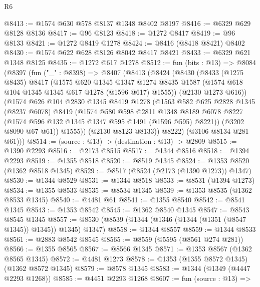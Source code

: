 \begin{lexlean}{R6}
\begin{coremodule}
@8413 := @1574 @630 @578 @8137 @1348 @8402 @8197
@8416 := @6329 @629 @8128 @8136
@8417 := @96 @8123
@8418 := @1272 @8417
@8419 := @96 @8133
@8421 := @1272 @8419 @1278
@8424 := @8416 (@8418 @8421) @8402
@8430 := @1574 @622 @628 @8126 @8042 @8417 @8421
@8433 := @6329 @621 @1348 @8125
@8435 := @1272 @617 @1278
@8512 := fun (bits : @13) =>
  @8084
    (@8397
      (fun ("_" : @8398) =>
      @8407
        (@8413
          (@8424
            (@8430
              (@8433
                (@1275 @8435)
                @8417
                (@1575
                  @620
                  @1345
                  @1347
                  @1274
                  @8435
                  @1587
                  (@1574 @618 @104 @1345 @1345 @617 @1278 (@1596 @617) @1555))
                (@2130 @1273 @616))
              (@1574
                @626
                @104
                @2830
                @1345
                @8419
                @1278
                (@1563
                  @582
                  @625
                  @2828
                  @1345
                  (@8237 @6078)
                  @8419
                  (@1574
                    @580
                    @598
                    @2811
                    @1348
                    @8189
                    @6078
                    @8227
                    (@1574 @596 @132 @1345 @1347 @595 @1491 (@1596 @595) @8221))
                  (@3202 @8090 @67 @61))
                @1555))
            (@2130 @8123 @8133))
          @8222)
        (@3106 @8134 @281 @61)))
@8514 := (source : @13) -> (destination : @13) -> @2809
@8515 := @1390 @2293
@8516 := @2173 @8515
@8517 := @1344 @8516
@8518 := @1394 @2293
@8519 := @1355 @8518
@8520 := @8519 @1345
@8524 := @1353 @8520 (@1362 @8518 @1345)
@8529 := @8517 (@8524 (@2173 (@1390 @1273)) @1347)
@8530 := @1344 @8529
@8531 := @1344 @8518
@8533 := @8531 (@1394 @1273)
@8534 := @1355 @8533
@8535 := @8534 @1345
@8539 := @1353 @8535 (@1362 @8533 @1345)
@8540 := @4481 @61
@8541 := @1355 @8540
@8542 := @8541 @1345
@8543 := @1353 @8542
@8545 := @1362 @8540 @1345
@8547 := @8543 @8545 @1345
@8557 := @8530 (@8539 (@1344 (@1346 (@1344 (@1351 (@8547 @1345)) @1345)) @1345) @1347)
@8558 := @1344 @8557
@8559 := @1344 @8533
@8561 := @2883 @8542 @8545
@8565 := @8559 (@5595 (@8561 @274 @281))
@8566 := @1355 @8565
@8567 := @8566 @1345
@8571 := @1353 @8567 (@1362 @8565 @1345)
@8572 := @4481 @1273
@8578 := @1353 (@1355 @8572 @1345) (@1362 @8572 @1345)
@8579 := @8578 @1345
@8583 := @1344 (@1349 (@4447 @2293 @1268))
@8585 := @4451 @2293 @1268
@8607 := fun (source : @13) =>

\end{coremodule}
\end{lexlean}
